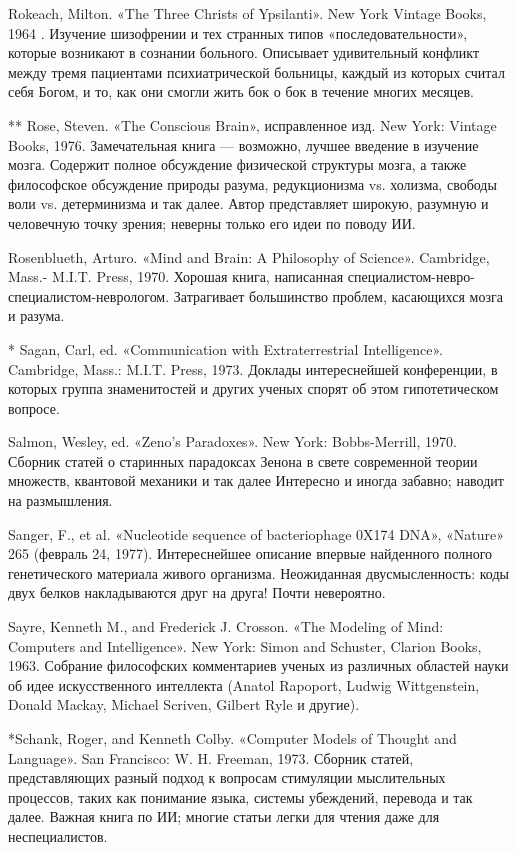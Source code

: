 Rokeach, Milton. «The Three Christs of Ypsilanti». New York Vintage Books, 1964 . Изучение шизофрении и тех странных типов «последовательности», которые возникают в сознании больного. Описывает удивительный конфликт между тремя пациентами психиатрической больницы, каждый из которых считал себя Богом, и то, как они смогли жить бок о бок в течение многих месяцев.

** Rose, Steven. «The Conscious Brain», исправленное изд. New York: Vintage Books, 1976. Замечательная книга --- возможно, лучшее введение в изучение мозга. Содержит полное обсуждение физической структуры мозга, а также философское обсуждение природы разума, редукционизма vs. холизма, свободы воли vs. детерминизма и так далее. Автор представляет широкую, разумную и человечную точку зрения; неверны только его идеи по поводу ИИ.

Rosenblueth, Arturo. «Mind and Brain: A Philosophy of Science». Cambridge, Mass.- M.I.T. Press, 1970. Хорошая книга, написанная специалистом-невро-специалистом-неврологом. Затрагивает большинство проблем, касающихся мозга и разума.

* Sagan, Carl, ed. «Communication with Extraterrestrial Intelligence». Cambridge, Mass.: M.I.T. Press, 1973. Доклады интереснейшей конференции, в которых группа знаменитостей и других ученых спорят об этом гипотетическом вопросе.

Salmon, Wesley, ed. «Zeno's Paradoxes». New York: Bobbs-Merrill, 1970. Сборник статей о старинных парадоксах Зенона в свете современной теории множеств, квантовой механики и так далее Интересно и иногда забавно; наводит на размышления.

Sanger, F., et al. «Nucleotide sequence of bacteriophage 0X174 DNA», «Nature» 265 (февраль 24, 1977). Интереснейшее описание впервые найденного полного генетического материала живого организма. Неожиданная двусмысленность: коды двух белков накладываются друг на друга! Почти невероятно.

Sayre, Kenneth M., and Frederick J. Crosson. «The Modeling of Mind: Computers and Intelligence». New York: Simon and Schuster, Clarion Books, 1963. Собрание философских комментариев ученых из различных областей науки об идее искусственного интеллекта (Anatol Rapoport, Ludwig Wittgenstein, Donald Mackay, Michael Scriven, Gilbert Ryle и другие).

*Schank, Roger, and Kenneth Colby. «Computer Models of Thought and Language». San Francisco: W. H. Freeman, 1973. Сборник статей, представляющих разный подход к вопросам стимуляции мыслительных процессов, таких как понимание языка, системы убеждений, перевода и так далее. Важная книга по ИИ; многие статьи легки для чтения даже для неспециалистов.


